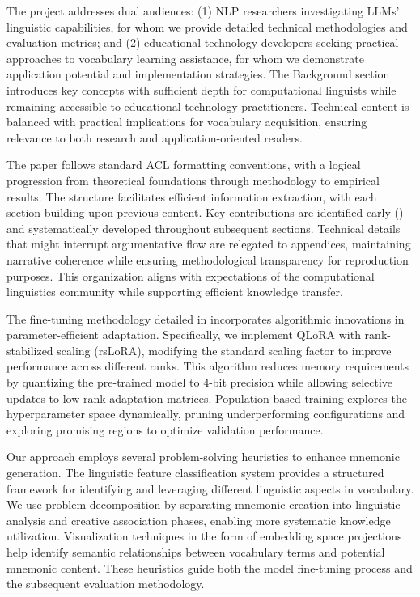  The project addresses dual audiences: (1) NLP researchers investigating LLMs' linguistic capabilities, for whom we provide detailed technical methodologies and evaluation metrics; and (2) educational technology developers seeking practical approaches to vocabulary learning assistance, for whom we demonstrate application potential and implementation strategies. The Background section introduces key concepts with sufficient depth for computational linguists while remaining accessible to educational technology practitioners. Technical content is balanced with practical implications for vocabulary acquisition, ensuring relevance to both research and application-oriented readers.

 The paper follows standard ACL formatting conventions, with a logical progression from theoretical foundations through methodology to empirical results. The structure facilitates efficient information extraction, with each section building upon previous content. Key contributions are identified early () and systematically developed throughout subsequent sections. Technical details that might interrupt argumentative flow are relegated to appendices, maintaining narrative coherence while ensuring methodological transparency for reproduction purposes. This organization aligns with expectations of the computational linguistics community while supporting efficient knowledge transfer.

 The fine-tuning methodology detailed in  incorporates algorithmic innovations in parameter-efficient adaptation. Specifically, we implement QLoRA with rank-stabilized scaling (rsLoRA), modifying the standard scaling factor to improve performance across different ranks. This algorithm reduces memory requirements by quantizing the pre-trained model to 4-bit precision while allowing selective updates to low-rank adaptation matrices. Population-based training explores the hyperparameter space dynamically, pruning underperforming configurations and exploring promising regions to optimize validation performance.

 Our approach employs several problem-solving heuristics to enhance mnemonic generation. The linguistic feature classification system provides a structured framework for identifying and leveraging different linguistic aspects in vocabulary. We use problem decomposition by separating mnemonic creation into linguistic analysis and creative association phases, enabling more systematic knowledge utilization. Visualization techniques in the form of embedding space projections help identify semantic relationships between vocabulary terms and potential mnemonic content. These heuristics guide both the model fine-tuning process and the subsequent evaluation methodology.

